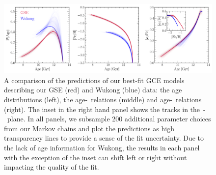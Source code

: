\documentclass[ms.tex]{subfiles}
\begin{document}
\begin{figure}
\centering
\includegraphics[scale = 0.45]{gse_wukong_comparison.pdf}
\caption{
A comparison of the predictions of our best-fit GCE models describing our
GSE (red) and Wukong (blue) data: the age distributions (left), the
age-\feh~relations (middle) and age-\afe~relations (right).
The inset in the right hand panel shows the tracks in the~\afe-\feh~plane.
In all panels, we subsample 200 additional parameter choices from our Markov
chains and plot the predictions as high transparency lines to provide a sense
of the fit uncertainty.
Due to the lack of age information for Wukong, the results in each panel with
the exception of the inset can shift left or right without impacting the
quality of the fit.
}
\label{fig:comparison}
\end{figure}
\end{document}
